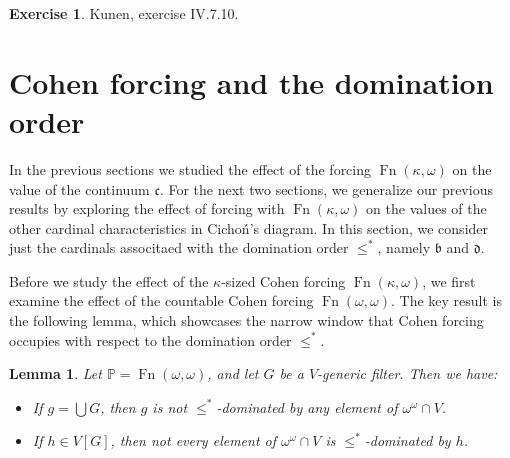 \documentclass[11pt,oneside]{amsbook}
\newcommand{\PP}{\mathbb P}
\DeclareMathOperator{\Fn}{Fn}
\theoremstyle{definition}
\newtheorem{exerc}{Exercise}[section]
\theoremstyle{plain}
\newtheorem{lem}[thm]{Lemma}
\theoremstyle{definition}
\theoremstyle{remark}
\begin{document}
\begin{exerc}
  Kunen, exercise IV.7.10.
\end{exerc}


\section{Cohen forcing and the domination order}

In the previous sections we studied the effect of the forcing $\Fn(\kappa,\omega)$ on the value of the continuum $\mathfrak c$. For the next two sections, we generalize our previous results by exploring the effect of forcing with $\Fn(\kappa,\omega)$ on the values of the other cardinal characteristics in Cicho\'n's diagram. In this section, we consider just the cardinals associtaed with the domination order $\leq^*$, namely $\mathfrak b$ and $\mathfrak d$.

Before we study the effect of the $\kappa$-sized Cohen forcing $\Fn(\kappa,\omega)$, we first examine the effect of the countable Cohen forcing $\Fn(\omega,\omega)$. The key result is the following lemma, which showcases the narrow window that Cohen forcing occupies with respect to the domination order $\leq^*$.

\begin{lem}
  \label{lem:cohen-dominating}
  Let $\PP=\Fn(\omega,\omega)$, and let $G$ be a $V$-generic filter. Then we have:
  \begin{itemize}
  \item If $g=\bigcup G$, then $g$ is not $\leq^*$-dominated by any element of $\omega^\omega\cap V$.
  \item If $h\in V[G]$, then not every element of $\omega^\omega\cap V$ is $\leq^*$-dominated by $h$.
  \end{itemize}
\end{lem}
\end{document}
